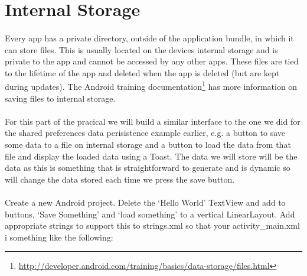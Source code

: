 \section{Internal Storage}
\paragraph{} Every app has a private directory, outside of the application bundle, in which it can store files. This is usually located on the devices internal storage and is private to the app and cannot be accessed by any other apps. These files are tied to the lifetime of the app and deleted when the app is deleted (but are kept during updates). The Android training documentation\footnote{\url{http://developer.android.com/training/basics/data-storage/files.html}} has more information on saving files to internal storage.

\paragraph{} For this part of the pracical we will build a similar interface to the one we did for the shared preferences data perisistence example earlier, e.g. a button to save some data to a file on internal storage and a button to load the data from that file and display the loaded data using a Toast. The data we will store will be the data as this is something that is straightforward to generate and is dynamic so will change the data stored each time we press the save button.

\paragraph{} Create a new Android project. Delete the `Hello World' TextView and add to buttons, `Save Something' and `load something' to a vertical LinearLayout. Add appropriate strings to support this to strings.xml so that your activity\_main.xml i something like the following:


